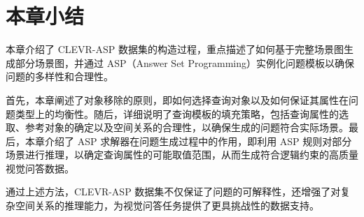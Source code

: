 \section{本章小结}
本章介绍了 CLEVR-ASP 数据集的构造过程，重点描述了如何基于完整场景图生成部分场景图，并通过 ASP（Answer Set Programming）实例化问题模板以确保问题的多样性和合理性。

首先，本章阐述了对象移除的原则，即如何选择查询对象以及如何保证其属性在问题类型上的均衡性。随后，详细说明了查询模板的填充策略，包括查询属性的选取、参考对象的确定以及空间关系的合理性，以确保生成的问题符合实际场景。最后，本章介绍了 ASP 求解器在问题生成过程中的作用，即利用 ASP 规则对部分场景进行推理，以确定查询属性的可能取值范围，从而生成符合逻辑约束的高质量视觉问答数据。

通过上述方法，CLEVR-ASP 数据集不仅保证了问题的可解释性，还增强了对复杂空间关系的推理能力，为视觉问答任务提供了更具挑战性的数据支持。